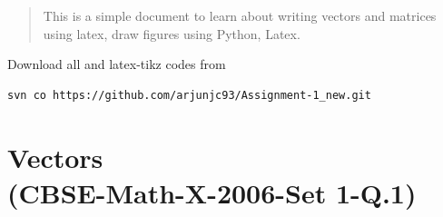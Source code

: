 \documentclass[journal,12pt,twocolumn]{IEEEtran}
\begin{document}
\newpage
\bigskip
\renewcommand{\thefigure}{\theenumi}
\renewcommand{\thetable}{\theenumi}
\begin{abstract}
This is a simple document to learn about writing vectors and matrices using latex, draw figures using Python, Latex.
\end{abstract}
%
Download all and latex-tikz codes from 
%
\begin{lstlisting}
svn co https://github.com/arjunjc93/Assignment-1_new.git
\end{lstlisting}
%
\section{Vectors\\(CBSE-Math-X-2006-Set 1-Q.1)}
\renewcommand{\theequation}{\theenumi}
\end{document}
